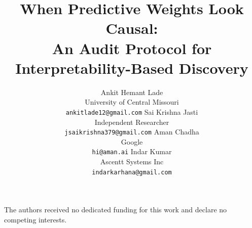 \documentclass{article}
\title{When Predictive Weights Look Causal:\\
An Audit Protocol for Interpretability-Based Discovery}
\author{%
Ankit Hemant Lade\\
University of Central Missouri\\
\texttt{ankitlade12@gmail.com}
\And
Sai Krishna Jasti\\
Independent Researcher\\
\texttt{jsaikrishna379@gmail.com}
\AND
Aman Chadha\\
Google\\
\texttt{hi@aman.ai}
\And
Indar Kumar\\
Ascentt Systems Inc\\
\texttt{indarkarhana@gmail.com}
}
\begin{document}
\maketitle


\label{lastmainpage}

\begin{ack}
The authors received no dedicated funding for this work and declare no
competing interests.
\end{ack}
\clearpage


\clearpage
\appendix

\end{document}
